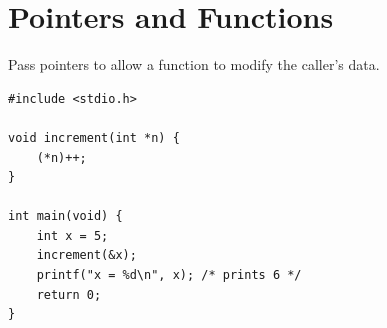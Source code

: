 \documentclass[11pt,a4paper]{article}
\begin{document}
\section{Pointers and Functions}
Pass pointers to allow a function to modify the caller's data.

\begin{lstlisting}
#include <stdio.h>

void increment(int *n) {
    (*n)++;
}

int main(void) {
    int x = 5;
    increment(&x);
    printf("x = %d\n", x); /* prints 6 */
    return 0;
}
\end{lstlisting}
\end{document}
